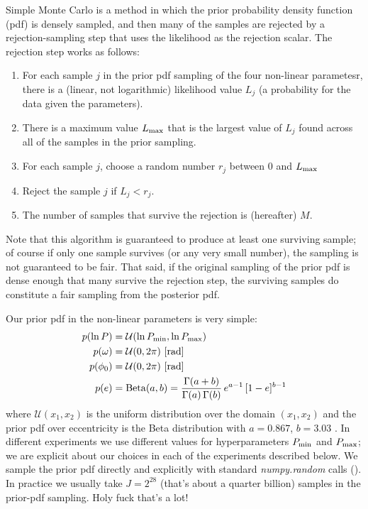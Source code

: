\documentclass[manuscript, letterpaper]{aastex6}
\newcommand{\project}[1]{\textsl{#1}}
\begin{document}
Simple Monte Carlo is a method in which the prior probability density function
(pdf) is densely sampled, and then many of the samples are rejected by a
rejection-sampling step that uses the likelihood as the rejection scalar.
The rejection step works as follows:
\begin{enumerate}\itemsep0ex
\item For each sample $j$ in the prior pdf sampling of the four non-linear
  parametesr, there is a (linear, not logarithmic) likelihood value $L_j$ (a
  probability for the data given the parameters).
\item There is a maximum value $L_{\rm max}$ that is the largest value of
  $L_j$ found across all of the samples in the prior sampling.
\item For each sample $j$, choose a random number $r_j$ between 0 and
  $L_{\rm max}$
\item Reject the sample $j$ if $L_j < r_j$.
\item The number of samples that survive the rejection is (hereafter) $M$.
\end{enumerate}
Note that this algorithm is guaranteed to produce at least one
surviving sample; of course if only one sample survives (or any very
small number), the sampling is not guaranteed to be fair.
That said, if the original sampling of the prior pdf is dense enough
that many survive the rejection step, the surviving samples do
constitute a fair sampling from the posterior pdf.

Our prior pdf in the non-linear parameters is very simple:
\begin{align}
    p(\ln P) &= \mathcal{U}(\ln P_{\rm min}, \ln P_{\rm max})\\
    p(\omega) &= \mathcal{U}(0, 2\pi) ~ [{\rm rad}]\\
    p(\phi_0) &= \mathcal{U}(0, 2\pi) ~ [{\rm rad}]\\
    p(e) &= {\rm Beta}(a, b) = \frac{\Gamma(a+b)}{\Gamma(a) \, \Gamma(b)} \, e^{a-1} \, [1 - e]^{b-1}
\end{align}
where $\mathcal{U}(x_1, x_2)$ is the uniform distribution over the
domain $(x_1, x_2)$ and the prior pdf over eccentricity is the Beta
distribution with $a=0.867$, $b=3.03$ \citep{Kipping:2013}.
In different experiments we use different values for hyperparameters
$P_{\rm min}$ and $P_{\rm max}$; we are explicit about our choices in
each of the experiments described below.
We sample the prior pdf directly and explicitly with standard
\project{numpy.random} calls (\citealt{Van-der-Walt:2011}).
In practice we usually take $J=2^{28}$ (that's about a quarter billion)
samples in the prior-pdf sampling. Holy fuck that's a lot!
\end{document}
